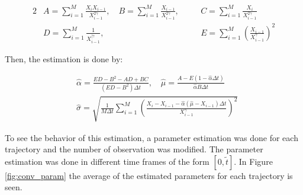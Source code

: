 \documentclass[11pt]{article}
\theoremstyle{definition}
\theoremstyle{remark}
\theoremstyle{remark}
\begin{document}
\begin{alignat*}{2}
  &A = \sum_{i=1}^M \frac{X_iX_{i-1}}{X_{i-1}^{2\gamma}}, \quad
  B= \sum_{i=1}^M \frac{X_{i-1}}{X_{i-1}^{2\gamma}}, \quad
  &&C = \sum_{i=1}^M \frac{X_i}{X_{i-1}^{2\gamma}} \\
  &D = \sum_{i=1}^M \frac{1}{X_{i-1}^{|\gamma}}, \quad
  &&E = \sum_{i=1}^M \left(\frac{X_{i-1}}{X_{i-1}^\gamma}\right)^2
\end{alignat*}

Then, the estimation is done by:

\begin{align*}
  &\hat{\alpha} = \frac{ED - B^2 - AD + BC}{(ED - B^2)\Delta t}, \quad
    \hat{\mu} = \frac{A - E(1 - \hat{\alpha} \Delta t)}{\hat{\alpha} B \Delta t} \\
  &\hat{\sigma} = \sqrt{\frac{1}{M \Delta t} \sum_{i=1}^M
    \left(\frac{X_i - X_{i-1} - \hat{\alpha}(\hat{\mu} - X_{i-1})\Delta t}{
    X_{i-1}^\gamma}\right)^2}
\end{align*}

To see the behavior of this estimation, a parameter estimation was
done for each trajectory and the number of observation was
modified. The parameter estimation was done in different time frames
of the form $[0, \tilde{t}]$. In Figure \ref{fig:conv_param} the
average of the estimated parameters for each trajectory is seen.
\end{document}
